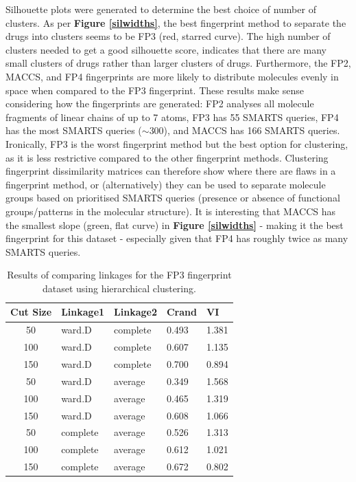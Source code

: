 \documentclass[11pt]{article}
\begin{document}
Silhouette plots were generated to determine the best choice of number of clusters. As per \textbf{Figure \ref{silwidths}}, the best fingerprint method to separate the drugs into clusters seems to be FP3 (red, starred curve). The high number of clusters needed to get a good silhouette score, indicates that there are many small clusters of drugs rather than larger clusters of drugs. Furthermore, the FP2, MACCS, and FP4 fingerprints are more likely to distribute molecules evenly in space when compared to the FP3 fingerprint. These results make sense considering how the fingerprints are generated: FP2 analyses all molecule fragments of linear chains of up to 7 atoms, FP3 has 55 SMARTS queries, FP4 has the most SMARTS queries ($\sim$300), and MACCS has 166 SMARTS queries. Ironically, FP3 is the worst fingerprint method but the best option for clustering, as it is less restrictive compared to the other fingerprint methods. Clustering fingerprint dissimilarity matrices can therefore show where there are flaws in a fingerprint method, or (alternatively) they can be used to separate molecule groups based on prioritised SMARTS queries (presence or absence of functional groups/patterns in the molecular structure). It is interesting that MACCS has the smallest slope (green, flat curve) in \textbf{Figure \ref{silwidths}} - making it the best fingerprint for this dataset - especially given that FP4 has roughly twice as many SMARTS queries. 

\begin{table}[H]
\centering
\begin{tabular}{cllll}
\toprule
\textbf{Cut Size} & \textbf{Linkage1} & \textbf{Linkage2} & \textbf{Crand} & \textbf{VI} \\
\midrule
50                & ward.D            & complete          & 0.493          & 1.381       \\
100               & ward.D            & complete          & 0.607          & 1.135       \\
150               & ward.D            & complete          & 0.700          & 0.894       \\
\midrule
50                & ward.D            & average           & 0.349          & 1.568       \\
100               & ward.D            & average           & 0.465          & 1.319       \\
150               & ward.D            & average           & 0.608          & 1.066       \\
\midrule
50                & complete          & average           & 0.526          & 1.313       \\
100               & complete          & average           & 0.612          & 1.021       \\
150               & complete          & average           & 0.672          & 0.802      \\
\bottomrule
\end{tabular}
\caption{Results of comparing linkages for the FP3 fingerprint dataset using hierarchical clustering.}
\label{table-hclust-comp}
\end{table}
\end{document}

